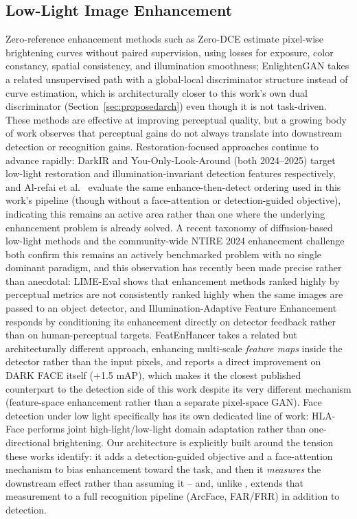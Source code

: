 \documentclass[conference]{IEEEtran}
\begin{document}
\subsection{Low-Light Image Enhancement}
Zero-reference enhancement methods such as Zero-DCE
\cite{zerodce} estimate pixel-wise brightening curves without
paired supervision, using losses for exposure, color constancy,
spatial consistency, and illumination smoothness; EnlightenGAN
\cite{enlightengan} takes a related unsupervised path with a
global-local discriminator structure instead of curve estimation,
which is architecturally closer to this work's own dual
discriminator (Section~\ref{sec:proposedarch}) even though it is
not task-driven. These methods
are effective at improving perceptual quality, but a growing
body of work \cite{lowlightsurvey} observes that perceptual gains
do not always translate into downstream detection or recognition
gains. Restoration-focused approaches continue to advance rapidly:
DarkIR \cite{darkir} and You-Only-Look-Around
\cite{yola} (both 2024--2025) target low-light restoration and
illumination-invariant detection features respectively, and
Al-refai et al.~\cite{tworstage2025} evaluate the same
enhance-then-detect ordering used in this work's pipeline (though
without a face-attention or detection-guided objective),
indicating this remains an active area rather than one where the
underlying enhancement problem is already solved. A recent taxonomy of diffusion-based low-light methods
\cite{diffusiontaxonomy2025} and the community-wide NTIRE 2024
enhancement challenge \cite{ntire2024} both confirm this remains
an actively benchmarked problem with no single dominant paradigm,
and this observation has recently been made precise rather
than anecdotal: LIME-Eval \cite{limeeval} shows that
enhancement methods ranked highly by perceptual metrics are not
consistently ranked highly when the same images are passed to an
object detector, and Illumination-Adaptive Feature Enhancement
\cite{iafeyolo} responds by conditioning its enhancement
directly on detector feedback rather than on human-perceptual
targets. FeatEnHancer \cite{featenhancer} takes a related but
architecturally different approach, enhancing multi-scale
\textit{feature maps} inside the detector rather than the input
pixels, and reports a direct improvement on DARK FACE itself
(+1.5 mAP), which makes it the closest published counterpart to
the detection side of this work despite its very different
mechanism (feature-space enhancement rather than a separate
pixel-space GAN). Face detection under low light specifically has
its own dedicated line of work: HLA-Face \cite{hlaface} performs
joint high-light/low-light domain adaptation rather than
one-directional brightening. Our architecture is explicitly built
around the tension these works identify: it adds a
detection-guided objective and a face-attention mechanism to bias
enhancement toward the task, and then it \textit{measures} the
downstream effect rather than assuming it -- and, unlike
\cite{limeeval,iafeyolo,featenhancer}, extends that measurement
to a full recognition pipeline (ArcFace, FAR/FRR) in addition to
detection.
\end{document}

